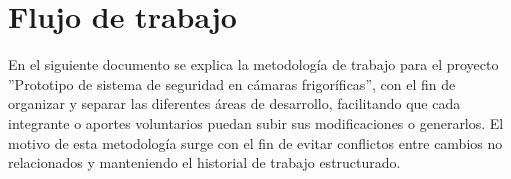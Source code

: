 \documentclass[a4paper]{article}
\begin{document}

\renewcommand{\normalsize}{\fontsize{12}{14}\selectfont}


\pagestyle{empty}
\fancyhf{}
\renewcommand{\headrulewidth}{0pt}
\renewcommand{\footrulewidth}{0pt}
\setlength{\footskip}{0pt}

\newpage

\setcounter{page}{0}
\tableofcontents

\newpage
\thispagestyle{fancy}
\flushbottom
\twocolumn

\section{Flujo de trabajo}
    \indent En el siguiente documento se explica la metodología de trabajo para el proyecto ''Prototipo de sistema de seguridad en cámaras frigoríficas'', con el fin de organizar y separar las diferentes áreas de desarrollo, facilitando que cada integrante o aportes voluntarios puedan subir sus modificaciones o generarlos.
    \indent El motivo de esta metodología surge con el fin de evitar conflictos entre cambios no relacionados y manteniendo el historial de trabajo estructurado.
    
\end{document}
